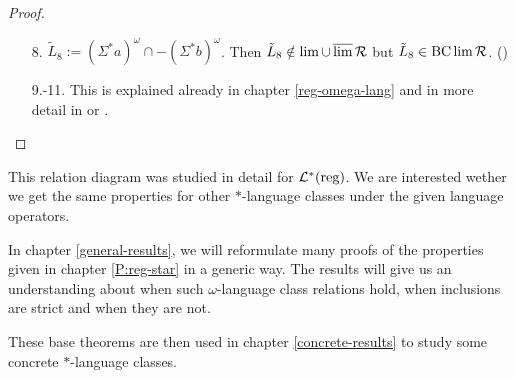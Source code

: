 \begin{lemma}
\begin{proof}
\begin{enumerate}
\item[8.]
$\tilde{L}_8 := (\Sigma^*a)^\omega \cap -(\Sigma^*b)^\omega$. Then $\tilde{L}_8 \notin \lim \cup \operatorname{\overline{lim}} \mathcal{R}$ but $\tilde{L}_8 \in \operatorname{BC} \lim \mathcal{R}$. (\cite[prop, p.38]{InfCompR101})

\item[9.-11.]
This is explained already in chapter \ref{reg-omega-lang} and in more detail in \cite{InfCompR101} or \cite[Theorem 3.1]{CombR107}.

\end{enumerate}
\end{proof}
\end{lemma}


This relation diagram was studied in detail for $\mathcal{L}^*(\text{reg})$. We are interested wether we get the same properties for other $*$-language classes under the given language operators.


In chapter \ref{general-results}, we will reformulate many proofs of the properties given in chapter \ref{P:reg-star} in a generic way. The results will give us an understanding about when such $\omega$-language class relations hold, when inclusions are strict and when they are not.

These base theorems are then used in chapter \ref{concrete-results} to study some concrete $*$-language classes.
